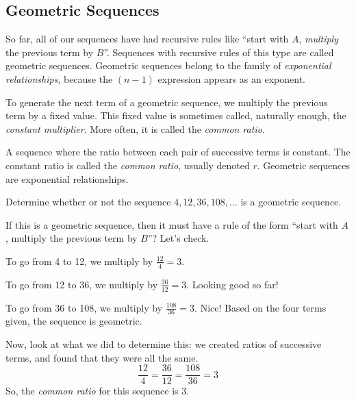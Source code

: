 \subsection{Geometric Sequences}

So far, all of our sequences have had recursive rules like ``start with $A$, \textit{multiply} the previous term by $B$''. Sequences with recursive rules of this type are called \glspl{geometric sequence}. Geometric sequences belong to the family of \textit{exponential relationships}, because the $(n-1)$ expression appears as an exponent.

To generate the next term of a geometric sequence, we multiply the previous term by a fixed value. This fixed value is sometimes called, naturally enough, the \textit{constant multiplier}. More often, it is called the \textit{common ratio}.

\begin{boxeddef}
A sequence where the ratio between each pair of successive terms is constant. The constant ratio is called the \textit{common ratio}, usually denoted $r$. Geometric sequences are exponential relationships.
\end{boxeddef}


\begin{boxedex}
Determine whether or not the sequence $4, 12, 36, 108, \dotsc$ is a geometric sequence.

\exsoln{} If this is a geometric sequence, then it must have a rule of the form ``start with $A$, multiply the previous term by $B$''? Let's check.

To go from 4 to 12, we multiply by $\frac{12}{4} = 3$.

To go from 12 to 36, we multiply by $\frac{36}{12} = 3$. Looking good so far!

To go from 36 to 108, we multiply by $\frac{108}{36} = 3$. Nice! Based on the four terms given, the sequence is geometric.

Now, look at what we did to determine this: we created ratios of successive terms, and found that they were all the same. \[\frac{12}{4} = \frac{36}{12} = \frac{108}{36} = 3\] So, the \textit{common ratio} for this sequence is 3.
\end{boxedex}


